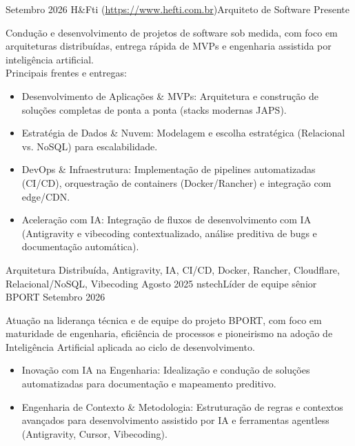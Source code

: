 %
%
%
\begin{experiences}
    \experience
        {Setembro 2026} {H\&Fti (\url{https://www.hefti.com.br})}{Arquiteto de Software}{}
        {Presente} { Condução e desenvolvimento de projetos de software sob medida, com foco em arquiteturas distribuídas, entrega rápida de MVPs e engenharia assistida por inteligência artificial.\\
        Principais frentes e entregas:
            \begin{itemize}
               \item Desenvolvimento de Aplicações \& MVPs: Arquitetura e construção de soluções completas de ponta a ponta (stacks modernas JAPS).
               \item Estratégia de Dados \& Nuvem: Modelagem e escolha estratégica (Relacional vs. NoSQL) para escalabilidade.
               \item DevOps \& Infraestrutura: Implementação de pipelines automatizadas (CI/CD), orquestração de containers (Docker/Rancher) e integração com edge/CDN.
               \item Aceleração com IA: Integração de fluxos de desenvolvimento com IA (Antigravity e vibecoding contextualizado, análise preditiva de bugs e documentação automática).
              \end{itemize}
            }
            {Arquitetura Distribuída, Antigravity, IA, CI/CD, Docker, Rancher, Cloudflare, Relacional/NoSQL, Vibecoding}
    \emptySeparator
    \experience
        {Agosto 2025} {nstech}{Líder de equipe sênior BPORT}{}
        {Setembro 2026} { Atuação na liderança técnica e de equipe do projeto BPORT, com foco em maturidade de engenharia, eficiência de processos e pioneirismo na adoção de Inteligência Artificial aplicada ao ciclo de desenvolvimento.
            \begin{itemize}
               \item Inovação com IA na Engenharia: Idealização e condução de soluções automatizadas para documentação e mapeamento preditivo.
               \item Engenharia de Contexto \& Metodologia: Estruturação de regras e contextos avançados para desenvolvimento assistido por IA e ferramentas agentless (Antigravity, Cursor, Vibecoding).

\end{itemize}}
\end{experiences}

